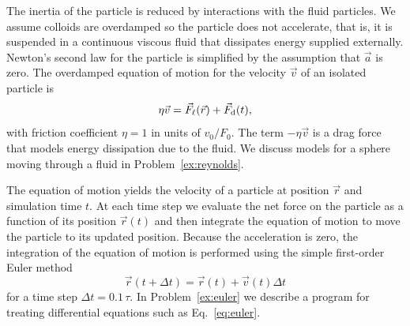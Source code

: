 \documentclass[preprint,showpacs,preprintnumbers,amsmath,amssymb,aps,prb]{revtex4-1}
\theoremstyle{remark}
\begin{document}
The inertia of the 
particle is reduced by interactions
with the fluid particles.\cite{Purcell1977}
We assume 
colloids are
overdamped
so the particle does not accelerate,
that is, it is suspended in a continuous viscous fluid
that dissipates energy supplied externally. 
Newton's second law for the particle
is simplified
by the assumption that $\vec{a}$ is zero. 
The overdamped equation of motion for
the velocity $\vec{v}$ of 
an isolated particle is
\begin{equation}
  \eta \vec{v} = \vec{F}_{\ell}(\vec{r}) + \vec{F}_{\rm d}(t),
    \label{eq:motion}
\end{equation}
with friction coefficient $\eta = 1$ in units of $v_0 / F_0$.
The term $-\eta \vec{v}$
is a drag force that models
energy dissipation due to the fluid. 
We discuss  models for
a sphere moving through a fluid in 
Problem~\ref{ex:reynolds}. 

The equation of motion  yields the velocity
of a particle at position $\vec{r}$ 
and simulation time $t$. At each time step
we evaluate the net force on the particle as a function of its position
$\vec{r}(t)$
and then integrate
the equation of motion to move the particle
to its updated position.
Because the acceleration is zero,
the integration of the equation of motion
is performed using 
the simple first-order Euler method 
\begin{equation}
  \vec{r}(t+\Delta t) = \vec{r}(t) + \vec{v}(t) \Delta t
    \label{eq:euler}
\end{equation}
for a time step $\Delta t = 0.1\,\tau$.
In 
Problem~\ref{ex:euler}
we describe a program for 
treating differential equations such as Eq.~\eqref{eq:euler}. %
\end{document}
